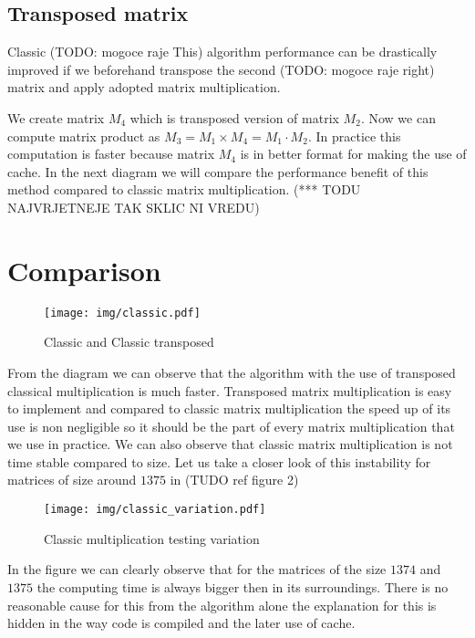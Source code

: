 \documentclass[a4paper,11pt]{article}
\begin{document}
\subsection{Transposed matrix}

Classic (TODO: mogoce raje This) algorithm performance can be drastically improved if we beforehand transpose the second (TODO: mogoce raje right) matrix and apply adopted matrix multiplication. 

We create matrix $M_{4}$ which is transposed version of matrix $M_{2}$. 
Now we can compute matrix product as $M_{3} = M_{1} \times M_{4} = M_{1} \cdot M_{2}$. 
In practice this computation is faster because matrix $M_{4}$ is in better format for making the use of cache.
In the next diagram we will compare the performance benefit of this method compared to classic matrix multiplication. (*** TODU NAJVRJETNEJE TAK SKLIC NI VREDU)

\section{Comparison}
\begin{figure}[h]
\centering
\texttt{[image: img/classic.pdf]}
\caption{Classic and Classic transposed}
\label{fig:classic}
\end{figure}

From the diagram we can observe that the algorithm with the use of transposed classical multiplication is much faster. 
Transposed matrix multiplication is easy to implement and compared to classic matrix multiplication the speed up of its use is non negligible so it should be the part of every matrix multiplication that we use in practice. 
We can also observe that classic matrix multiplication is not time stable compared to size.
Let us take a closer look of this instability for matrices of size around $1375$ in (TUDO ref figure 2)
\begin{figure}[h]
\centering
\texttt{[image: img/classic\_variation.pdf]}
\caption{Classic multiplication testing variation}
\label{fig:classic}
\end{figure}

In the figure we can clearly observe that for the matrices of the size $1374$ and $1375$ the computing time is always bigger then in its surroundings. 
There is no reasonable cause for this from the algorithm alone the explanation for this is hidden in the way code is compiled and the later use of cache.
\end{document}
